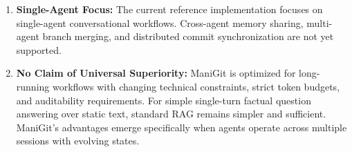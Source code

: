 \begin{enumerate}
    \item \textbf{Single-Agent Focus:} The current reference implementation focuses on single-agent conversational workflows. Cross-agent memory sharing, multi-agent branch merging, and distributed commit synchronization are not yet supported.
    \item \textbf{No Claim of Universal Superiority:} ManiGit is optimized for long-running workflows with changing technical constraints, strict token budgets, and auditability requirements. For simple single-turn factual question answering over static text, standard RAG remains simpler and sufficient. ManiGit's advantages emerge specifically when agents operate across multiple sessions with evolving states.
\end{enumerate}
